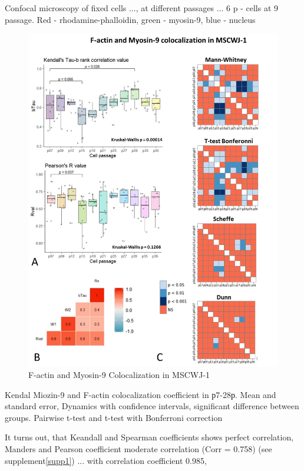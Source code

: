 \documentclass[english,authoryear]{elsarticle}
\begin{document}
Confocal microscopy of fixed cells ..., at different passages ... 6 p - cells at 9 passage. Red - rhodamine-phalloidin, green - myosin-9, blue - nucleus


\begin{figure}[hbt!]
\centering
\includegraphics[width=0.9\linewidth]{fig_m9-actin-col.jpg}
\caption{F-actin and Myosin-9 Colocalization in MSCWJ-1}
\label{m9-actin-col}
\end{figure}


Kendal Miozin-9 and F-actin colocalization coefficient in р7-28р. Mean and standard error, Dynamics with confidence intervals, significant difference between groups. Pairwise t-test and t-test with Bonferroni correction


It turns out, that Keandall and Spearman coefficients shows perfect correlation, Manders and Pearson coefficient moderate correlation (Corr = 0.758) (see supplement\ref{supp1}) ... with correlation coefficient 0.985,
\end{document}
